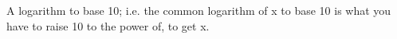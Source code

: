 A logarithm to base 10; i.e. the common logarithm of x to base 10
is what you have to raise 10 to the power of, to get x.